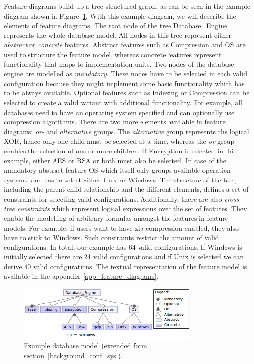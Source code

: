 Feature diagrams build up a tree-structured graph, as can be seen in the example diagram shown in Figure~\ref{background_variab_models_feature_diagram_example}. 
With this example diagram, we will describe the elements of feature diagrams. 
The root node of the tree \textsf{Database\_Engine} represents the whole database model. 
All nodes in this tree represent either \textit{abstract} or \textit{concrete} features. 
Abstract features such as \textsf{Compression} and \textsf{OS} are used to structure the feature model, whereas concrete features represent functionality that maps to implementation units. 
Two nodes of the database engine are modelled as \textit{mandatory}. 
These nodes have to be selected in each valid configuration because they might implement some basic functionality which has to be always available. 
Optional features such as \textsf{Indexing} or \textsf{Compression} can be selected to create a valid variant with additional functionality.
For example, all databases need to have an operating system specified and can optionally use compression algorithms. 
There are two more elements available in feature diagrams: \textit{or}- and \textit{alternative} groups. 
The \textit{alternative} group represents the logical XOR, hence only one child must be selected at a time, whereas the \textit{or} group enables the selection of one or more children. 
If \textsf{Encryption} is selected in this example, either \textsf{AES} or \textsf{RSA} or both must also be selected. 
In case of the mandatory abstract feature \textsf{OS} which itself only groups available operation systems, one has to select either \textsf{Unix} or \textsf{Windows}. 
The structure of the tree, including the parent-child relationship and the different elements, defines a set of constraints for selecting valid configurations.
Additionally, there are also \textit{cross-tree constraints} which represent logical expressions over the set of features. 
They enable the modelling of arbitrary formulas amongst the features in feature models.
For example, if users want to have zip-compression enabled, they also have to stick to Windows. 
Such constraints restrict the amount of valid configurations. 
In total, our example has 64 valid configurations. 
If \textsf{Windows} is initially selected there are 24 valid configurations and if \textsf{Unix} is selected we can derive 40 valid configurations.
The textual representation of the feature model is available in the appendix~\ref{app_feature_diagrams}.

\begin{figure}
  \centering
  \includegraphics[width=0.8\textwidth]{images/example_database}
  \caption{Example database model (extended form section~\ref{background_conf_sys}).}
  \label{background_variab_models_feature_diagram_example}
\end{figure}

